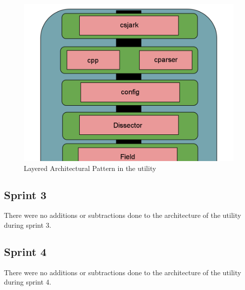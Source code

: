\begin{figure}[htb]
	\includegraphics[width=\textwidth]{./planning/img/layered}
	\caption{Layered Architectural Pattern in the \Gls{utility}\label{fig:layered}}
\end{figure}

\subsection{Sprint 3}
There were no additions or subtractions done to the architecture of the utility during sprint 3.

\subsection{Sprint 4}
There were no additions or subtractions done to the architecture of the utility during sprint 4.

